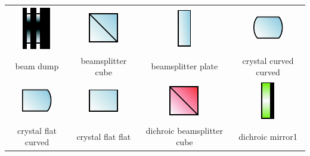 \begin{table}
\begin{tabular}{|c|c|c|c|}
\includegraphics{contrib/optics_components/beam_dump} & 
\includegraphics{contrib/optics_components/beamsplitter_cube} & 
\includegraphics{contrib/optics_components/beamsplitter_plate} & 
\includegraphics{contrib/optics_components/crystal_curved_curved}\\
\tiny beam dump & 
\tiny beamsplitter cube & 
\tiny beamsplitter plate & 
\tiny crystal curved curved\\
\hline

\includegraphics{contrib/optics_components/crystal_flat_curved} & 
\includegraphics{contrib/optics_components/crystal_flat_flat} & 
\includegraphics{contrib/optics_components/dichroic_beamsplitter_cube} &
\includegraphics{contrib/optics_components/dichroic_mirror1}\\
\tiny crystal flat curved & 
\tiny crystal flat flat & 
\tiny dichroic beamsplitter cube &
\tiny dichroic mirror1\\
\hline


\end{tabular}
\end{table}
